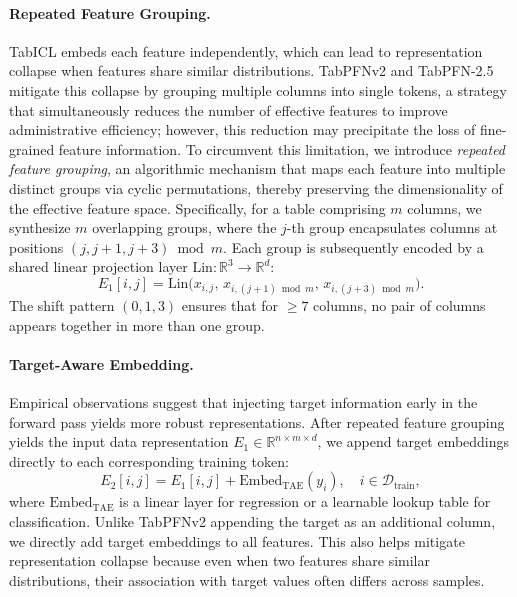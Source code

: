 \documentclass[conference]{IEEEtran}
\begin{document}
\paragraph{Repeated Feature Grouping.}
TabICL embeds each feature independently, which can lead to representation collapse when features share similar distributions. TabPFNv2 and TabPFN-2.5 mitigate this collapse by grouping multiple columns into single tokens, a strategy that simultaneously reduces the number of effective features to improve administrative efficiency; however, this reduction may precipitate the loss of fine-grained feature information. To circumvent this limitation, we introduce \emph{repeated feature grouping}, an algorithmic mechanism that maps each feature into multiple distinct groups via cyclic permutations, thereby preserving the dimensionality of the effective feature space. Specifically, for a table comprising $m$ columns, we synthesize $m$ overlapping groups, where the $j$-th group encapsulates columns at positions $(j, j+1, j+3) \bmod m$. Each group is subsequently encoded by a shared linear projection layer $\mathrm{Lin}: \mathbb{R}^3 \to \mathbb{R}^d$:
\begin{equation*}
	E_1[i,j] = \mathrm{Lin}\big(x_{i,j},\, x_{i, (j+1) \bmod m},\, x_{i, (j+3) \bmod m}\big).
\end{equation*}
The shift pattern $(0, 1, 3)$ ensures that for $\geq 7$ columns, no pair of columns appears together in more than one group.

\paragraph{Target-Aware Embedding.}
Empirical observations suggest that injecting target information early in the forward pass yields more robust representations. After repeated feature grouping yields the input data representation $E_1 \in \mathbb{R}^{n \times m \times d}$, we append target embeddings directly to each corresponding training token:
\begin{equation*}
	E_2[i,j] = E_1[i,j] + \mathrm{Embed_{\text{TAE}}}(y_i), \quad i \in \mathcal{D}_{\mathrm{train}},
\end{equation*}
where $\mathrm{Embed_{\text{TAE}}}$ is a linear layer for regression or a learnable lookup table for classification. Unlike TabPFNv2 appending the target as an additional column, we directly add target embeddings to all features. This also helps mitigate representation collapse because even when two features share similar distributions, their association with target values often differs across samples.
\end{document}
